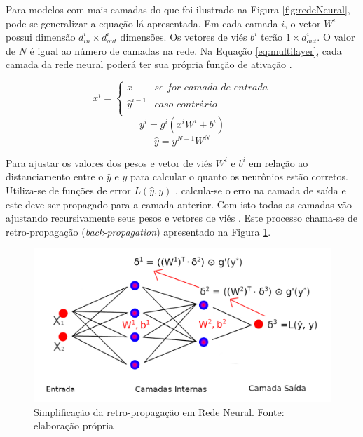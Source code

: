 Para modelos com mais camadas do que foi ilustrado na Figura \ref{fig:redeNeural}, pode-se generalizar a equação lá apresentada. Em cada camada $i$, o vetor $W^{i}$ possui dimensão $d^{i}_{in} \times d^{i}_{out}$ dimensões. Os vetores de viés $b^{i}$ terão $1 \times d^{i}_{out}$. O valor de $N$ é igual ao número de camadas na rede. Na Equação \ref{eq:multilayer}, cada camada da rede neural poderá ter sua própria função de ativação \cite{GOLDBERG2017}. 

\begin{displaymath}
    x^{i} = 
    \begin{cases}
      x & \textit{se for camada de entrada} \\
      \hat{y}^{i-1} & \textit{caso contrário} \\
    \end{cases}       
\end{displaymath}
\begin{equation}
	\label{eq:multilayer}
    y^{i} = g^{i}(x^{i}W^{i} + b^{i})
\end{equation}
\begin{displaymath}
    \hat{y} = y^{N-1}W^{N}
\end{displaymath}

Para ajustar os valores dos pesos e vetor de viés $W^{i}$ e $b^{i}$ em relação ao distanciamento entre o $\hat{y}$ e $y$ para calcular o quanto os neurônios estão corretos. Utiliza-se de funções de error $L(\hat{y}, y)$ \cite{GOLDBERG2017}, calcula-se o erro na camada de saída e este deve ser propagado para a camada anterior. Com isto todas as camadas vão ajustando recursivamente seus pesos e vetores de viés \cite{NIELSEN2015}. Este processo chama-se de retro-propagação (\textit{back-propagation}) apresentado na Figura \ref{fig:redeNeuralBackprop}.

\begin{figure}[h]
	\centering
    \includegraphics[keepaspectratio=true,scale=1.3]{figuras/redeNeuralBackprop}
	\caption[Retro-propagação em Rede Neural]{Simplificação da retro-propagação em Rede Neural. Fonte: elaboração própria}
	\label{fig:redeNeuralBackprop}
\end{figure}

